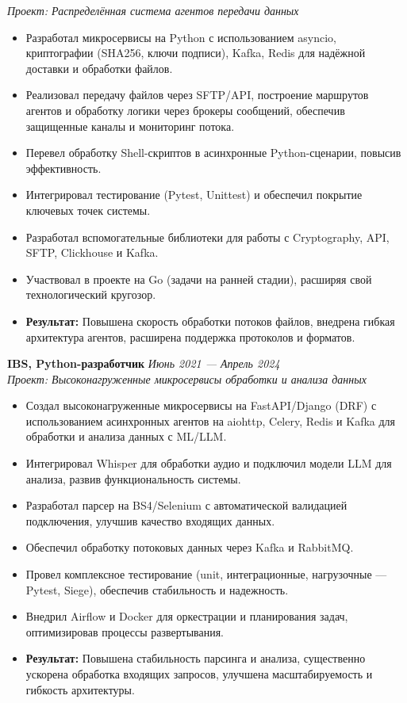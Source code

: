 \documentclass[11pt]{article}
\begin{document}
\textit{Проект: Распределённая система агентов передачи данных}
\begin{itemize}
    \vspace{-6pt}\item Разработал микросервисы на Python с использованием asyncio, криптографии (SHA256, ключи подписи), Kafka, Redis для надёжной доставки и обработки файлов.
    \item Реализовал передачу файлов через SFTP/API, построение маршрутов агентов и обработку логики через брокеры сообщений, обеспечив защищенные каналы и мониторинг потока.
    \item Перевел обработку Shell-скриптов в асинхронные Python-сценарии, повысив эффективность.
    \item Интегрировал тестирование (Pytest, Unittest) и обеспечил покрытие ключевых точек системы.
    \item Разработал вспомогательные библиотеки для работы с Cryptography, API, SFTP, Clickhouse и Kafka.
    \item Участвовал в проекте на Go (задачи на ранней стадии), расширяя свой технологический кругозор.
    \item \textbf{Результат:} Повышена скорость обработки потоков файлов, внедрена гибкая архитектура агентов, расширена поддержка протоколов и форматов.
\end{itemize}
\vspace{8pt}
\textbf{IBS, Python-разработчик} \hfill \textit{Июнь 2021 — Апрель 2024} \\
\textit{Проект: Высоконагруженные микросервисы обработки и анализа данных}
\begin{itemize}
    \vspace{-6pt}\item Создал высоконагруженные микросервисы на FastAPI/Django (DRF) с использованием асинхронных агентов на aiohttp, Celery, Redis и Kafka для обработки и анализа данных с ML/LLM.
    \item Интегрировал Whisper для обработки аудио и подключил модели LLM для анализа, развив функциональность системы.
    \item Разработал парсер на BS4/Selenium с автоматической валидацией подключения, улучшив качество входящих данных.
     \item Обеспечил обработку потоковых данных через Kafka и RabbitMQ.
    \item Провел комплексное тестирование (unit, интеграционные, нагрузочные — Pytest, Siege), обеспечив стабильность и надежность.
    \item Внедрил Airflow и Docker для оркестрации и планирования задач, оптимизировав процессы развертывания.
    \item \textbf{Результат:} Повышена стабильность парсинга и анализа, существенно ускорена обработка входящих запросов, улучшена масштабируемость и гибкость архитектуры.
\end{itemize}
\end{document}
